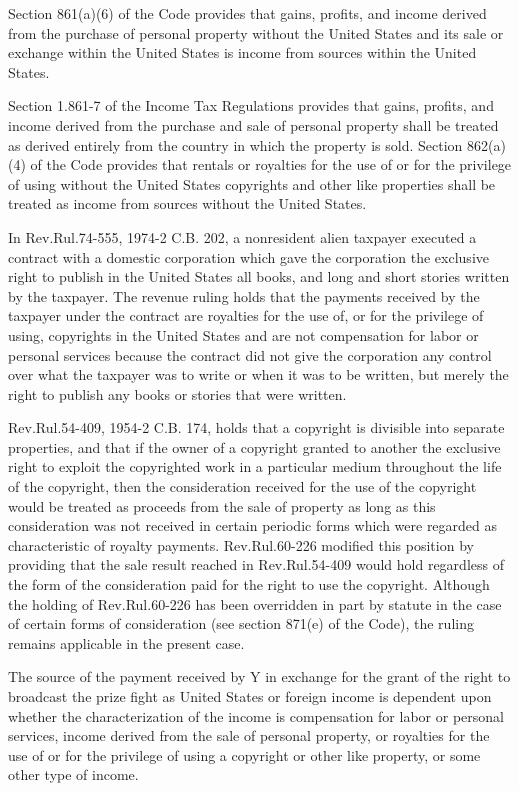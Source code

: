 \begin{select}
Section 861(a)(6) of the Code provides that gains, profits, and income derived from the purchase of personal property
without the United States and its sale or exchange within the United States is income from sources within the United
States.

Section 1.861-7 of the Income Tax Regulations provides that gains, profits, and income derived from the purchase
and sale of personal property shall be treated as derived entirely from the country in which the property is sold.
Section 862(a)(4) of the Code provides that rentals or royalties for the use of or for the privilege of using without the
United States copyrights and other like properties shall be treated as income from sources without the United States.

In Rev.\@\@ Rul.\@ 74-555, 1974-2 C.B. 202, a nonresident alien taxpayer executed a contract with a domestic corporation
which gave the corporation the exclusive right to publish in the United States all books, and long and short stories written by the taxpayer. The revenue ruling holds that the payments received by the taxpayer under the contract are royalties for the use of, or for the privilege of using, copyrights in the United States and are not compensation for labor or personal services because the contract did not give the corporation any control over what the taxpayer was to write or when it was to be written, but merely the right to publish any books or stories that were written.

Rev.\@\@ Rul.\@ 54-409, 1954-2 C.B. 174, holds that a copyright is divisible into separate properties, and that if the owner
of a copyright granted to another the exclusive right to exploit the copyrighted work in a particular medium throughout
the life of the copyright, then the consideration received for the use of the copyright would be treated as proceeds from
the sale of property as long as this consideration was not received in certain periodic forms which were regarded as
characteristic of royalty payments. Rev.\@\@ Rul.\@ 60-226 modified this position by providing that the sale result reached in
Rev.\@\@ Rul.\@ 54-409 would hold regardless of the form of the consideration paid for the right to use the copyright. Although
the holding of Rev.\@\@ Rul.\@ 60-226 has been overridden in part by statute in the case of certain forms of consideration (see
section 871(e) of the Code), the ruling remains applicable in the present case.

The source of the payment received by Y in exchange for the grant of the right to broadcast the prize fight as United
States or foreign income is dependent upon whether the characterization of the income is compensation for labor or
personal services, income derived from the sale of personal property, or royalties for the use of or for the privilege of
using a copyright or other like property, or some other type of income.


\end{select}
